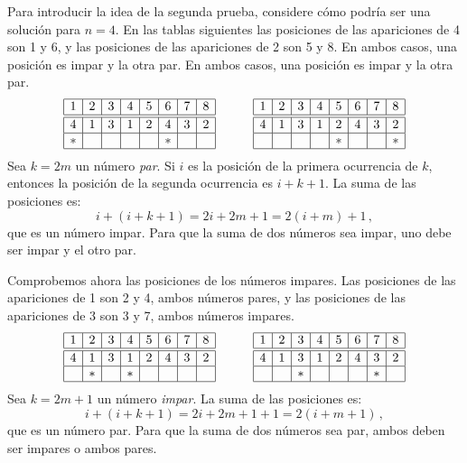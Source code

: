 Para introducir la idea de la segunda prueba, considere cómo podría ser una solución para $n=4$. En las tablas siguientes las posiciones de las apariciones de 4 son 1 y 6, y las posiciones de las apariciones de 2 son 5 y 8. En ambos casos, una posición es impar y la otra par. En ambos casos, una posición es impar y la otra par. 
\[
\begin{array}{|c|c|c|c|c|c|c|c|}
\hline
1&2&3&4&5&6&7&8\\
\hline\hline
4&1&3&1&2&4&3&2\\\hline
*&&&&&*&&\\\hline
\end{array}
\hspace{3em}
\begin{array}{|c|c|c|c|c|c|c|c|}
\hline
1&2&3&4&5&6&7&8\\
\hline\hline
4&1&3&1&2&4&3&2\\\hline
&&&&*&&&*\\\hline
\end{array}
\]
Sea $k=2m$ un número \emph{par}. Si $i$ es la posición de la primera ocurrencia de $k$, entonces la posición de la segunda ocurrencia es $i+k+1$.
La suma de las posiciones es:
\[
i+(i+k+1)=2i+2m+1=2(i+m)+1\,,
\]
que es un número impar. Para que la suma de dos números sea impar, uno debe ser impar y el otro par.

Comprobemos ahora las posiciones de los números impares. Las posiciones de las apariciones de 1 son 2 y 4, ambos números pares, y las posiciones de las apariciones de 3 son 3 y 7, ambos números impares.
\[
\begin{array}{|c|c|c|c|c|c|c|c|}
\hline
1&2&3&4&5&6&7&8\\
\hline\hline
4&1&3&1&2&4&3&2\\\hline
&*&&*&&&&\\\hline
\end{array}
\hspace{3em}
\begin{array}{|c|c|c|c|c|c|c|c|}
\hline
1&2&3&4&5&6&7&8\\
\hline\hline
4&1&3&1&2&4&3&2\\\hline
&&*&&&&*&\\\hline
\end{array}
\]
Sea $k=2m+1$ un número \emph{impar}. La suma de las posiciones es:
\[
i+(i+k+1)=2i+2m+1+1=2(i+m+1)\,,
\]
que es un número par. Para que la suma de dos números sea par, ambos deben ser impares o ambos pares.

